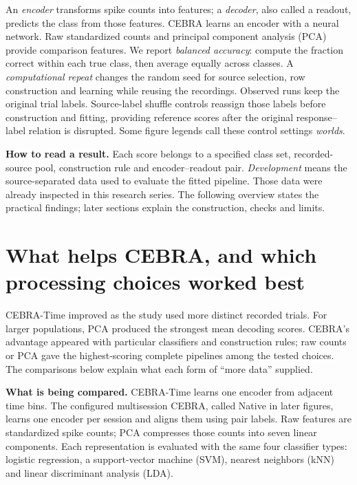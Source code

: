 \documentclass[10pt,a4paper]{article}
\newcommand{\key}[1]{\vspace{3pt}\noindent\colorbox{wash}{\parbox{\dimexpr\linewidth-2\fboxsep\relax}{\small #1}}\vspace{3pt}}
\begin{document}
An \emph{encoder} transforms spike counts into features; a \emph{decoder}, also called a readout, predicts the class from those features. CEBRA learns an encoder with a neural network. Raw standardized counts and principal component analysis (PCA) provide comparison features. We report \emph{balanced accuracy}: compute the fraction correct within each true class, then average equally across classes. A \emph{computational repeat} changes the random seed for source selection, row construction and learning while reusing the recordings. Observed runs keep the original trial labels. Source-label shuffle controls reassign those labels before construction and fitting, providing reference scores after the original response--label relation is disrupted. Some figure legends call these control settings \emph{worlds}.

\key{\textbf{How to read a result.} Each score belongs to a specified class set, recorded-source pool, construction rule and encoder--readout pair. \emph{Development} means the source-separated data used to evaluate the fitted pipeline. Those data were already inspected in this research series. The following overview states the practical findings; later sections explain the construction, checks and limits.}

\clearpage
\section{What helps CEBRA, and which processing choices worked best}
CEBRA-Time improved as the study used more distinct recorded trials. For larger populations, PCA produced the strongest mean decoding scores. CEBRA's advantage appeared with particular classifiers and construction rules; raw counts or PCA gave the highest-scoring complete pipelines among the tested choices. The comparisons below explain what each form of ``more data'' supplied.

\textbf{What is being compared.} CEBRA-Time learns one encoder from adjacent time bins. The configured multisession CEBRA, called Native in later figures, learns one encoder per session and aligns them using pair labels. Raw features are standardized spike counts; PCA compresses those counts into seven linear components. Each representation is evaluated with the same four classifier types: logistic regression, a support-vector machine (SVM), nearest neighbors (kNN) and linear discriminant analysis (LDA).
\end{document}
